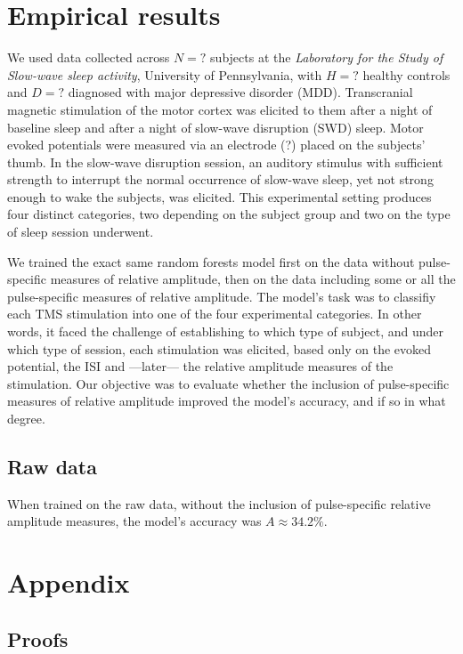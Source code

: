 \documentclass{article}
\begin{document}
\begin{multicols}{2}
\section{Empirical results}

We used data collected across $N = ?$ subjects at the \textit{Laboratory for the
Study of Slow-wave sleep activity}, University of Pennsylvania, with $H = ?$
healthy controls and $D = ?$ diagnosed with major depressive disorder (MDD).
Transcranial magnetic stimulation of the motor cortex was elicited to them after
a night of baseline sleep and after a night of slow-wave disruption (SWD) sleep.
Motor evoked potentials were measured via an electrode (?) placed on the
subjects' thumb. In the slow-wave disruption session, an auditory stimulus with
sufficient strength to interrupt the normal occurrence of slow-wave sleep, yet
not strong enough to wake the subjects, was elicited. This experimental setting
produces four distinct categories, two depending on the subject group and two on
the type of sleep session underwent.

We trained the exact same random forests model first on the data without
pulse-specific measures of relative amplitude, then on the data including some
or all the pulse-specific measures of relative amplitude. The model's task was
to classifiy each TMS stimulation into one of the four experimental categories.
In other words, it faced the challenge of establishing to which type of subject,
and under which type of session, each stimulation was elicited, based only on
the evoked potential, the ISI and ---later--- the relative amplitude measures of
the stimulation. Our objective was to evaluate whether the inclusion of
pulse-specific measures of relative amplitude improved the model's accuracy, and
if so in what degree. 


\subsection{Raw data}

When trained on the raw data, without the inclusion of
pulse-specific relative amplitude measures, the model's
accuracy was $A\approx34.2 \%$.

\pagebreak
\section{Appendix}

\subsection*{Proofs}


\end{multicols}
\end{document}
